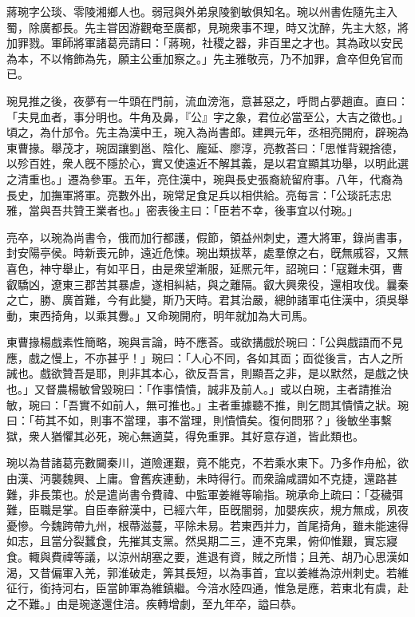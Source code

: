 
\begin{pinyinscope}
蔣琬字公琰、零陵湘鄉人也。弱冠與外弟泉陵劉敏俱知名。琬以州書佐隨先主入蜀，除廣都長。先主甞因游觀奄至廣都，見琬衆事不理，時又沈醉，先主大怒，將加罪戮。軍師將軍諸葛亮請曰：「蔣琬，社稷之器，非百里之才也。其為政以安民為本，不以脩飾為先，願主公重加察之。」先主雅敬亮，乃不加罪，倉卒但免官而已。

琬見推之後，夜夢有一牛頭在門前，流血滂沲，意甚惡之，呼問占夢趙直。直曰：「夫見血者，事分明也。牛角及鼻，『公』字之象，君位必當至公，大吉之徵也。」頃之，為什邡令。先主為漢中王，琬入為尚書郎。建興元年，丞相亮開府，辟琬為東曹掾。舉茂才，琬固讓劉邕、陰化、龐延、廖淳，亮教荅曰：「思惟背親捨德，以殄百姓，衆人旣不隱於心，實又使遠近不解其義，是以君宜顯其功舉，以明此選之清重也。」遷為參軍。五年，亮住漢中，琬與長史張裔統留府事。八年，代裔為長史，加撫軍將軍。亮數外出，琬常足食足兵以相供給。亮每言：「公琰託志忠雅，當與吾共贊王業者也。」密表後主曰：「臣若不幸，後事宜以付琬。」

亮卒，以琬為尚書令，俄而加行都護，假節，領益州刺史，遷大將軍，錄尚書事，封安陽亭侯。時新喪元帥，遠近危悚。琬出類拔萃，處羣僚之右，旣無戚容，又無喜色，神守舉止，有如平日，由是衆望漸服，延熈元年，詔琬曰：「寇難未弭，曹叡驕凶，遼東三郡苦其暴虐，遂相糾結，與之離隔。叡大興衆役，還相攻伐。曩秦之亡，勝、廣首難，今有此變，斯乃天時。君其治嚴，總帥諸軍屯住漢中，須吳舉動，東西掎角，以乘其釁。」又命琬開府，明年就加為大司馬。

東曹掾楊戲素性簡略，琬與言論，時不應荅。或欲搆戲於琬曰：「公與戲語而不見應，戲之慢上，不亦甚乎！」琬曰：「人心不同，各如其靣；靣從後言，古人之所誡也。戲欲贊吾是耶，則非其本心，欲反吾言，則顯吾之非，是以默然，是戲之快也。」又督農楊敏曾毀琬曰：「作事憒憒，誠非及前人。」或以白琬，主者請推治敏，琬曰：「吾實不如前人，無可推也。」主者重據聽不推，則乞問其憒憒之狀。琬曰：「苟其不如，則事不當理，事不當理，則憒憒矣。復何問邪？」後敏坐事繫獄，衆人猶懼其必死，琬心無適莫，得免重罪。其好意存道，皆此類也。

琬以為昔諸葛亮數闚秦川，道險運艱，竟不能克，不若乘水東下。乃多作舟舩，欲由漢、沔襲魏興、上庸。會舊疾連動，未時得行。而衆論咸謂如不克捷，還路甚難，非長策也。於是遣尚書令費禕、中監軍姜維等喻指。琬承命上疏曰：「芟穢弭難，臣職是掌。自臣奉辭漢中，已經六年，臣旣闇弱，加嬰疾疢，規方無成，夙夜憂慘。今魏跨帶九州，根蔕滋蔓，平除未易。若東西并力，首尾掎角，雖未能速得如志，且當分裂蠶食，先摧其支黨。然吳期二三，連不克果，俯仰惟艱，實忘寢食。輙與費禕等議，以涼州胡塞之要，進退有資，賊之所惜；且羌、胡乃心思漢如渴，又昔偏軍入羌，郭淮破走，筭其長短，以為事首，宜以姜維為涼州刺史。若維征行，銜持河右，臣當帥軍為維鎮繼。今涪水陸四通，惟急是應，若東北有虞，赴之不難。」由是琬遂還住涪。疾轉增劇，至九年卒，謚曰恭。


\end{pinyinscope}
